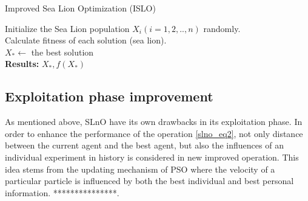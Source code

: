 \documentclass[a4paper,13pt,2p]{report}
\begin{document}
\begin{algorithm}[!t]
\caption{Improved Sea Lion Optimization (ISLO)}
\label{algorithm_islo}
\SetAlgoLined
 Initialize the Sea Lion population $X_i (i=1,2,.., n)$ randomly. \\
 Calculate fitness of each solution (sea lion). \\
 $X_*\gets$ the best solution \\
 \textbf{Results:}  $X_*, f(X_*)$
\end{algorithm}
   
\subsection{Exploitation phase improvement}
\label{imprv_exploit}
	As mentioned above, SLnO have its own drawbacks in its exploitation phase. In order to enhance the performance of the operation \ref{slno_eq2}, not only distance between the current agent and the best agent, but also the influences of an individual experiment in history is considered in new improved operation. This idea stems from the updating mechanism of PSO \cite{eberhart1995particle} where the velocity of a particular particle is influenced by both the best individual and best personal information. ***************.
	
\end{document}
